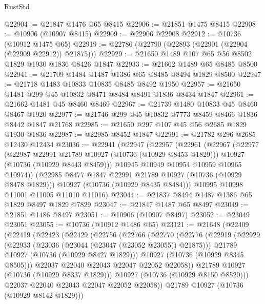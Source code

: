 \begin{lexlean}{RustStd}
\begin{coremodule}
@22904 := @21847 @1476 @65 @8415
@22906 := @21851 @1475 @8415
@22908 := @10906 (@10907 @8415)
@22909 := @22906 @22908
@22912 := @10736 (@10912 @1475 @65)
@22919 := @22786 (@22790 (@22893 (@22901 (@22904 (@22909 @22912)) @21875)))
@22929 := @21650 @1489 @107 @65 @56 @8502 @1829 @1930 @1836 @8426 @1847
@22933 := @21662 @1489 @65 @8485 @8500
@22941 := @21709 @1484 @1487 @1386 @65 @8485 @8494 @1829 @8500
@22947 := @21718 @1483 @10833 @10835 @8485 @8492 @1950
@22957 := @21650 @1481 @299 @45 @10832 @8471 @8484 @8491 @1836 @8434 @1847
@22961 := @21662 @1481 @45 @8460 @8469
@22967 := @21739 @1480 @10833 @45 @8460 @8467 @1920
@22977 := @21746 @299 @45 @10832 @7773 @8459 @8466 @1836 @8442 @1847 @21768
@22985 := @21650 @297 @107 @45 @56 @2685 @1829 @1930 @1836
@22987 := @22985 @8452 @1847
@22991 := @21782 @296 @2685 @12430 @12434
@23036 := @22941
    (@22947
      (@22957
        (@22961
          (@22967
            (@22977
              (@22987 @22991 @21789 @10927 (@10736 (@10929 @8453 @1829)))
              @10927
              (@10736 (@10929 @8443 @8459)))
            @10945
            @10949
            @10954
            @10959
            @10965
            @10974))
        (@22985 @8477 @1847 @22991 @21789 @10927 (@10736 (@10929 @8478 @1829)))
        @10927
        (@10736 (@10929 @8435 @8484)))
      @10995
      @10998
      @11001
      @11005
      @11010
      @11016)
@23044 := @21837 @8494 @1487 @1386 @65 @1829 @8497 @1829 @7829
@23047 := @21847 @1487 @65 @8497
@23049 := @21851 @1486 @8497
@23051 := @10906 (@10907 @8497)
@23052 := @23049 @23051
@23055 := @10736 (@10912 @1486 @65)
@23121 := @21648
    (@22409
      (@22419
        (@22423
          (@22429
            (@22756
              (@22766
                (@22770
                  (@22776
                    (@22919
                      (@22929
                        (@22933 (@23036 (@23044 (@23047 (@23052 @23055)) @21875)))
                        @21789
                        @10927
                        (@10736 (@10929 @8427 @1829)))
                      @10927
                      (@10736 (@10929 @8345 @8505)))
                    @22037
                    @22040
                    @22043
                    @22047
                    @22052
                    @22058))
                @21789
                @10927
                (@10736 (@10929 @8337 @1829)))
              @10927
              (@10736 (@10929 @8150 @8520)))
            @22037
            @22040
            @22043
            @22047
            @22052
            @22058))
        @21789
        @10927
        (@10736 (@10929 @8142 @1829)))

\end{coremodule}
\end{lexlean}
